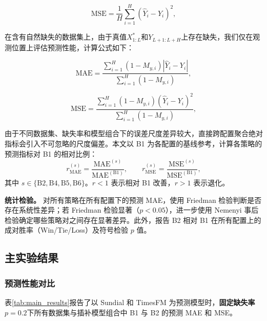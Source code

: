 \documentclass{article}
\begin{document}
\begin{equation}
	\text{MSE} =\frac{1}{H}\sum_{i=1}^H (\hat{Y}_i - Y_i)^2,
\end{equation}

在含有自然缺失的数据集上，由于真值$X^\ast_{1:L}$和$Y_{L+1:L+H}$上存在缺失，我们仅在观测位置上评估预测性能，计算公式如下：

\begin{equation}
	\text{MAE} =\frac{\sum_{i=1}^H (1-M_{y, i}) |\hat{Y}_i - Y_i|}{\sum_{i=1}^H (1-M_{y, i})},
\end{equation}

\begin{equation}
	\text{MSE} =\frac{\sum_{i=1}^H (1-M_{y, i}) (\hat{Y}_i - Y_i)^2}{\sum_{i=1}^H (1-M_{y, i})},
\end{equation}

由于不同数据集、缺失率和模型组合下的误差尺度差异较大，直接跨配置聚合绝对指标会引入不可忽略的尺度偏差。本文以 B1 为各配置的基线参考，计算各策略的预测指标对 B1 的相对比例：
\begin{equation}
	r_{\text{MAE}}^{(s)} = \frac{\text{MAE}^{(s)}}{\text{MAE}^{(\text{B1})}}, \qquad
	r_{\text{MSE}}^{(s)} = \frac{\text{MSE}^{(s)}}{\text{MSE}^{(\text{B1})}},
\end{equation}
其中 $s \in \{\text{B2}, \text{B4}, \text{B5}, \text{B6}\}$。$r < 1$ 表示相对 B1 改善，$r > 1$ 表示退化。

\textbf{统计检验。} 对所有策略在所有配置下的预测 MAE，使用 Friedman 检验判断是否存在系统性差异；若 Friedman 检验显著（$p < 0.05$），进一步使用 Nemenyi 事后检验确定哪些策略对之间存在显著差异。此外，报告 B2 相对 B1 在所有配置上的成对胜率（Win/Tie/Loss）及符号检验 $p$ 值。

\subsection{主实验结果}

\subsubsection{预测性能对比}\label{sec:main_results}

表\ref{tab:main_results}报告了以 Sundial 和 TimesFM 为预测模型时，\textbf{固定缺失率 $p=0.2$}下所有数据集与插补模型组合中 B1 与 B2 的预测 MAE 和 MSE。
\end{document}
